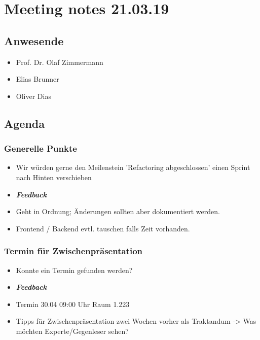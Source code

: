 \hypertarget{meeting-notes-210319}{%
\section*{Meeting notes 21.03.19}\label{meeting-notes-210319}}

\hypertarget{anwesende}{%
\subsection*{Anwesende}\label{anwesende}}

\begin{itemize}
\item
  Prof. Dr. Olaf Zimmermann
\item
  Elias Brunner
\item
  Oliver Dias
\end{itemize}

\hypertarget{agenda}{%
\subsection*{Agenda}\label{agenda}}

\hypertarget{generelle-punkte}{%
\subsubsection*{Generelle Punkte}\label{generelle-punkte}}

\begin{itemize}
\item
  Wir würden gerne den Meilenstein 'Refactoring abgeschlossen' einen Sprint nach Hinten verschieben 
\item \emph{\textbf{Feedback}}
\item Geht in Ordnung; Änderungen sollten aber dokumentiert werden.
\item Frontend / Backend evtl. tauschen falls Zeit vorhanden.
\end{itemize}

\hypertarget{termin-fuxfcr-zwischenpruxe4sentation}{%
\subsubsection*{Termin für
Zwischenpräsentation}\label{termin-fuxfcr-zwischenpruxe4sentation}}

\begin{itemize}
\item Konnte ein Termin gefunden werden? 
\item \emph{\textbf{Feedback}}
\item Termin 30.04 09:00 Uhr Raum 1.223
\item Tipps für Zwischenpräsentation zwei Wochen vorher als Traktandum
  -\textgreater{} Was möchten Experte/Gegenleser sehen?
\end{itemize}

